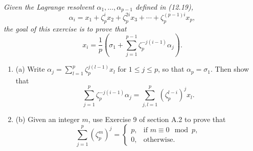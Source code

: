 \documentclass[11pt,a4paper]{article}
\newcommand{\be} {\begin{enumerate}}
\newcommand{\ee} {\end{enumerate}}
\begin{document}
{\it Given the Lagrange resolvent $\alpha_1,\ldots,\alpha_{p-1}$ defined in (12.19),
$$ \alpha_i = x_1+\zeta_p^ix_2+\zeta_p^{2i} x_3 + \cdots+\zeta_p^{(p-1) i} x_p,$$ 
the goal of this exercise is to prove that
$$x_i = \frac{1}{p}\left( \sigma_1 + \sum_{j=1}^{p-1} \zeta_p^{-j(i-1)} \alpha_j \right).$$
\be
\item[(a)] Write $\alpha_j = \sum_{l=1}^p \zeta_p^{j(l-1)}x_l$ for $1\leq j \leq p$, so that $
\alpha_p = \sigma_1$. Then show that
$$\sum_{j=1}^p \zeta_p^{-j(i-1)}\alpha_j = \sum_{j,l = 1}^p (\zeta_p^{l-i})^j x_l.$$
\item[(b)] Given an integer $m$, use Exercise 9 of section A.2 to prove that
$$
\sum_{j=1}^p (\zeta_p^m)^j =
\left\{
\begin{array}{ll}
 p, &  \text{if }m\equiv 0 \mod p,    \\
 0, &  \text{otherwise}.   
\end{array}
\right.
$$
\ee
}
\end{document}
